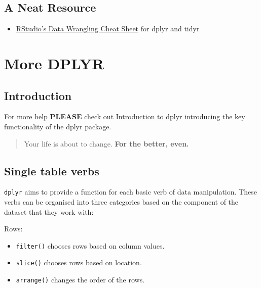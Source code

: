 \documentclass[
]{book}
\providecommand{\tightlist}{%
  \setlength{\itemsep}{0pt}\setlength{\parskip}{0pt}}
\begin{document}
\hypertarget{a-neat-resource}{%
\section{A Neat Resource}\label{a-neat-resource}}

\begin{itemize}
\tightlist
\item
  \href{http://www.rstudio.com/wp-content/uploads/2015/02/data-wrangling-cheatsheet.pdf}{RStudio's Data Wrangling Cheat Sheet} for dplyr and tidyr
\end{itemize}

\hypertarget{more-dplyr}{%
\chapter{More DPLYR}\label{more-dplyr}}

\hypertarget{introduction-5}{%
\section{Introduction}\label{introduction-5}}

For more help \textbf{PLEASE} check out \href{https://cran.r-project.org/web/packages/dplyr/vignettes/dplyr.html}{Introduction to dplyr} introducing the key functionality of the dplyr package.

\begin{quote}
Your life is about to change. \textbf{For the better, even.}
\end{quote}

\hypertarget{single-table-verbs-1}{%
\section{Single table verbs}\label{single-table-verbs-1}}

\texttt{dplyr} aims to provide a function for each basic verb of data manipulation. These verbs can be organised into three categories based on the component of the dataset that they work with:

Rows:

\begin{itemize}
\tightlist
\item
  \texttt{filter()} chooses rows based on column values.
\item
  \texttt{slice()} chooses rows based on location.
\item
  \texttt{arrange()} changes the order of the rows.
\end{itemize}
\end{document}
